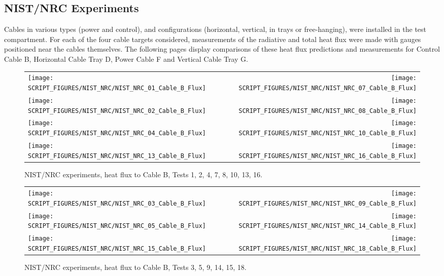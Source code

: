 \clearpage

\subsection{NIST/NRC Experiments}

Cables in various types (power and control), and configurations (horizontal, vertical, in trays or free-hanging), were installed in
the test compartment. For each of the four cable targets considered, measurements of the radiative and total heat flux were made with
gauges positioned near the cables themselves.  The following pages display comparisons of these heat flux predictions and measurements for Control Cable B, Horizontal Cable Tray D, Power Cable F and Vertical Cable Tray G.

\newpage

\begin{figure}[p]
\begin{tabular*}{\textwidth}{l@{\extracolsep{\fill}}r}
\texttt{[image: SCRIPT\_FIGURES/NIST\_NRC/NIST\_NRC\_01\_Cable\_B\_Flux]} &
\texttt{[image: SCRIPT\_FIGURES/NIST\_NRC/NIST\_NRC\_07\_Cable\_B\_Flux]} \\
\texttt{[image: SCRIPT\_FIGURES/NIST\_NRC/NIST\_NRC\_02\_Cable\_B\_Flux]} &
\texttt{[image: SCRIPT\_FIGURES/NIST\_NRC/NIST\_NRC\_08\_Cable\_B\_Flux]} \\
\texttt{[image: SCRIPT\_FIGURES/NIST\_NRC/NIST\_NRC\_04\_Cable\_B\_Flux]} &
\texttt{[image: SCRIPT\_FIGURES/NIST\_NRC/NIST\_NRC\_10\_Cable\_B\_Flux]} \\
\texttt{[image: SCRIPT\_FIGURES/NIST\_NRC/NIST\_NRC\_13\_Cable\_B\_Flux]} &
\texttt{[image: SCRIPT\_FIGURES/NIST\_NRC/NIST\_NRC\_16\_Cable\_B\_Flux]}
\end{tabular*}
\caption[NIST/NRC experiments, heat flux to Cable B, Tests 1, 2, 4, 7, 8, 10, 13, 16]
{NIST/NRC experiments, heat flux to Cable B, Tests 1, 2, 4, 7, 8, 10, 13, 16.}
\label{NIST_NRC_Cable_B_Flux_Closed}
\end{figure}

\begin{figure}[p]
\begin{tabular*}{\textwidth}{l@{\extracolsep{\fill}}r}
\texttt{[image: SCRIPT\_FIGURES/NIST\_NRC/NIST\_NRC\_03\_Cable\_B\_Flux]} &
\texttt{[image: SCRIPT\_FIGURES/NIST\_NRC/NIST\_NRC\_09\_Cable\_B\_Flux]} \\
\texttt{[image: SCRIPT\_FIGURES/NIST\_NRC/NIST\_NRC\_05\_Cable\_B\_Flux]} &
\texttt{[image: SCRIPT\_FIGURES/NIST\_NRC/NIST\_NRC\_14\_Cable\_B\_Flux]} \\
\texttt{[image: SCRIPT\_FIGURES/NIST\_NRC/NIST\_NRC\_15\_Cable\_B\_Flux]} &
\texttt{[image: SCRIPT\_FIGURES/NIST\_NRC/NIST\_NRC\_18\_Cable\_B\_Flux]}
\end{tabular*}
\caption[NIST/NRC experiments, heat flux to Cable B, Tests 3, 5, 9, 14, 15, 18]
{NIST/NRC experiments, heat flux to Cable B, Tests 3, 5, 9, 14, 15, 18.}
\label{NIST_NRC_Cable_B_Flux_Open}
\end{figure}


